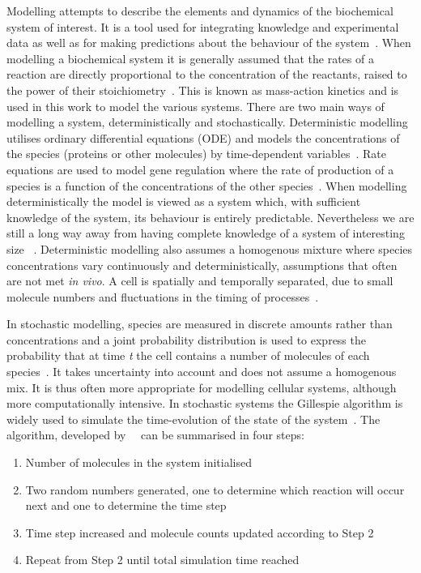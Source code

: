Modelling attempts to describe the elements and dynamics of the biochemical system of interest. It is a tool used for integrating knowledge and experimental data as well as for making predictions about the behaviour of the system~\autocite{wilkinson:2006}. When modelling a biochemical system it is generally assumed that the rates of a reaction are directly proportional to the concentration of the reactants, raised to the power of their stoichiometry~\autocite{wilkinson:2006}. This is known as mass-action kinetics and is used in this work to model the various systems.  
There are two main ways of modelling a system, deterministically and stochastically. Deterministic modelling utilises ordinary differential equations (ODE) and models the concentrations of the species (proteins or other molecules) by time-dependent variables~\autocite{deJong:2002ft}. Rate equations are used to model gene regulation where the rate of production of a species is a function of the concentrations of the other species~\autocite{deJong:2002ft}. When modelling deterministically the model is viewed as a system which, with sufficient knowledge of the system, its behaviour is entirely predictable. Nevertheless we are still a long way away from having complete knowledge of a system of interesting size ~\cite{wilkinson:2006}. Deterministic modelling also assumes a homogenous mixture where species concentrations vary continuously and deterministically, assumptions that often are not met \textit{in vivo}. A cell is spatially and temporally separated, due to small molecule numbers and fluctuations in the timing of processes~\autocite{deJong:2002ft}.  
   
In stochastic modelling, species are measured in discrete amounts rather than concentrations and a joint probability distribution is used to express the probability that at time \textit{t} the cell contains a number of molecules of each species~\autocite{deJong:2002ft}. It takes uncertainty into account and does not assume a homogenous mix. It is thus often more appropriate for modelling cellular systems, although more computationally intensive. In stochastic systems the Gillespie algorithm is widely used to simulate the time-evolution of the state of the system~\autocite{wilkinson:2006}. The algorithm, developed by~\textcite{Gillespie:1977ww}~\autocite{Gillespie:1977ww} can be summarised in four steps:
\begin{enumerate}
\item Number of molecules in the system initialised
\item Two random numbers generated, one to determine which reaction will occur next and one to determine the time step
\item Time step increased and molecule counts updated according to Step 2 
\item Repeat from Step 2 until total simulation time reached
\end{enumerate}
   
